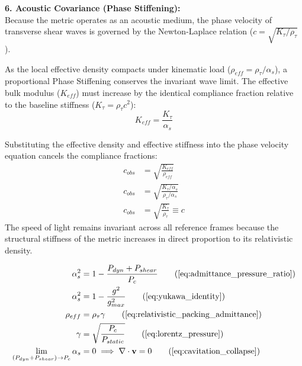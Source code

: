 \vspace{0.2 cm}

\textbf{6. Acoustic Covariance (Phase Stiffening):} \\
Because the metric operates as an acoustic medium, the phase velocity of transverse shear waves is governed by the Newton-Laplace relation ($c = \sqrt{K_\tau/\rho_\tau}$). 

As the local effective density compacts under kinematic load ($\rho_{eff} = \rho_{\tau} / \alpha_s$), a proportional Phase Stiffening conserves the invariant wave limit. The effective bulk modulus ($K_{eff}$) must increase by the identical compliance fraction relative to the baseline stiffness ($K_\tau = \rho_{\tau} c^2$):
\begin{equation}
    K_{eff} = \frac{K_\tau}{\alpha_s} \label{eq:effective_bulk_modulus}
\end{equation}

Substituting the effective density and effective stiffness into the phase velocity equation cancels the compliance fractions:
\begin{align}
    c_{obs} &= \sqrt{\frac{K_{eff}}{\rho_{eff}}} \nonumber \\
    c_{obs} &= \sqrt{\frac{K_\tau / \alpha_s}{\rho_{\tau} / \alpha_s}} \nonumber \\
    c_{obs} &= \sqrt{\frac{K_\tau}{\rho_{\tau}}} \equiv c \label{eq:acoustic_covariance_proof}
\end{align}
The speed of light remains invariant across all reference frames because the structural stiffness of the metric increases in direct proportion to its relativistic density.

\begin{tcolorbox}[recallbox, title={\ref{box:viscoelastic_stiffening}. Viscoelastic Phase Stiffening \& Time Dilation}]
\begin{align}
    \alpha_s^2 &= 1 - \frac{P_{dyn} + P_{shear}}{P_c} \tag{\ref{eq:admittance_pressure_ratio}} \\
    \alpha_s^2 &= 1 - \frac{g^2}{g_{max}^2} \tag{\ref{eq:yukawa_identity}} \\
    \rho_{eff} &= \rho_{\tau} \gamma \tag{\ref{eq:relativistic_packing_admittance}} \\
    \gamma &= \sqrt{\frac{P_c}{P_{static}}} \tag{\ref{eq:lorentz_pressure}} \\
    \lim_{(P_{dyn}+P_{shear}) \to P_c} \alpha_s &= 0 \implies \nabla \cdot \mathbf{v} = 0 \tag{\ref{eq:cavitation_collapse}} 
\end{align}
\end{tcolorbox}


